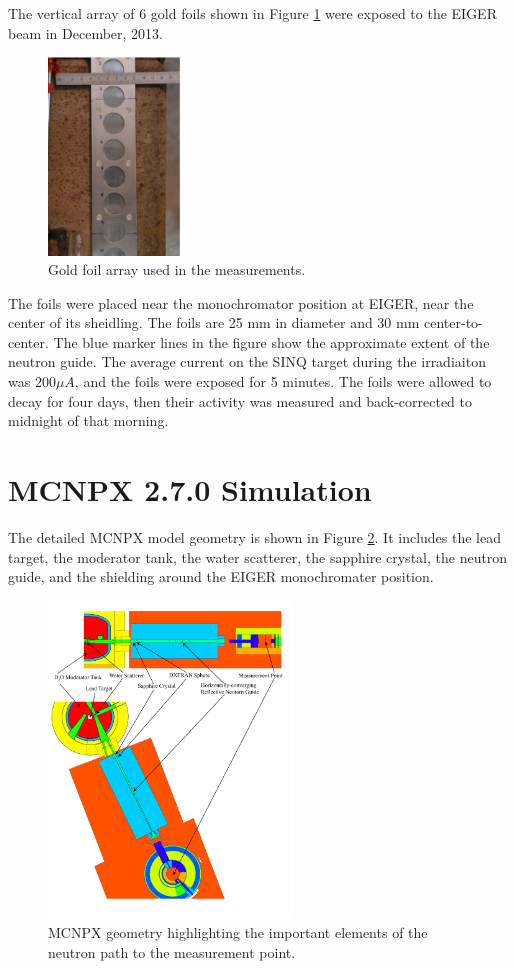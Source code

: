 \documentclass[a4paper,
              ]{jacow}
\begin{document}
The vertical array of 6 gold foils shown in Figure \ref{foils} were exposed to the EIGER beam in December, 2013.   

\begin{figure}[!htb]
   \centering
   \includegraphics*[width=35mm]{graphics/foils.eps}
   \caption{Gold foil array used in the measurements.}
   \label{foils}
\end{figure}

The foils were placed near the monochromator position at EIGER, near the center of its sheidling.  The foils are 25 mm in diameter and 30 mm center-to-center.  The blue marker lines in the figure show the approximate extent of the neutron guide.  The average current on the SINQ target during the irradiaiton was $200 \mu A$, and the foils were exposed for 5 minutes.  The foils were allowed to decay for four days, then their activity was measured and back-corrected to midnight of that morning.


\section{MCNPX 2.7.0 Simulation}

The detailed MCNPX model geometry is shown in Figure \ref{geom}.  It includes the lead target, the moderator tank, the water scatterer, the sapphire crystal, the neutron guide, and the shielding around the EIGER monochromater position.

\begin{figure}[!htb]
   \centering
   \includegraphics*[width=65mm]{graphics/geom.pdf}
   \caption{MCNPX geometry highlighting the important elements of the neutron path to the measurement point.}
   \label{geom}
\end{figure}
\end{document}
